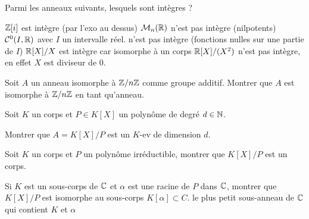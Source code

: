 \documentclass{report}
\begin{document}
\begin{exo}
    Parmi les anneaux suivants, lesquels sont intègres ?
    \begin{enumerate}
        \itt \(\mathbb{Z}[i]\) est intègre (par l'exo au dessus)
        \itt \(\mathcal{M}_n(\mathbb{R})\) n'est pas intègre (nilpotents)
        \itt \(\mathcal{C}^0(I, \mathbb{R})\) avec \(I\) un intervalle réel. n'est pas intègre (fonctions nulles sur une partie de \(I\))
        \itt \(\mathbb{R}[X]/X\) est intègre car isomorphe à un corps
        \itt \(\mathbb{R}[X]/(X^2)\) n'est pas intègre, en effet \(X\) est diviseur de \(0\).
    \end{enumerate}
\end{exo}

\begin{exo}
    Soit \(A\) un anneau isomorphe à \(\mathbb{Z}/n\mathbb{Z}\) comme groupe additif. Montrer que
    \(A\) est isomorphe à \(\mathbb{Z}/n\mathbb{Z}\) en tant qu'anneau.
\end{exo}

\begin{exo}
    Soit \(K\) un corps et \(P\in K[X]\) un polynôme de degré \(d\in\mathbb{N}\).
    \begin{q}{1}
        Montrer que \(A=K[X]/P\) est un \(K\)-ev de dimension \(d\).
    \end{q}
    \begin{q}{2}
        Soit \(K\) un corps et \(P\) un polynôme irréductible, montrer que \(K[X]/P\)
        est un corps.
    \end{q}
    \begin{q}{3}
        Si \(K\) est un sous-corps de \(\mathbb{C}\) et \(\alpha\) est une racine de \(P\)
        dans \(\mathbb{C}\), montrer que \(K[X]/P\) est isomorphe au sous-corps \(K[\alpha]\subset C\).
        le plus petit sous-anneau de \(\mathbb{C}\) qui contient \(K\) et \(\alpha\)
    \end{q}
\end{exo}
\end{document}
